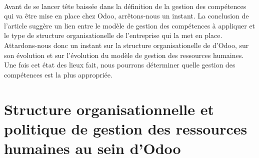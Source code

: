 \paragraph{}Avant de se lancer tête baissée dans la définition de la gestion des compétences qui va être mise en place chez Odoo, arrêtons-nous un instant. La conclusion de l'article\citep{delobbe} suggère un lien entre le modèle de gestion des compétences à appliquer et le type de structure organisationelle de l'entreprise qui la met en place. Attardons-nous donc un instant sur la structure organisationelle de d'Odoo, sur son évolution et sur l'évolution du modèle de gestion des ressources humaines. Une fois cet état des lieux fait, nous pourrons déterminer quelle gestion des compétences est la plus appropriée.
        



\section{Structure organisationnelle et politique de gestion des ressources humaines au sein d'Odoo}
